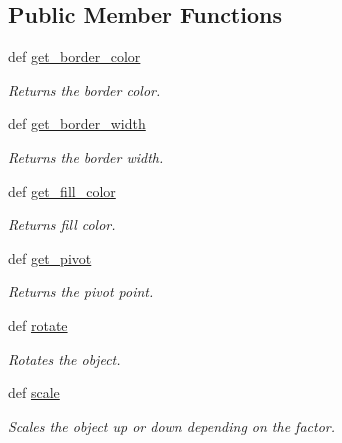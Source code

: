 \subsection*{Public Member Functions}
\begin{DoxyCompactItemize}
\item 
def \hyperlink{classcs110graphics_1_1Fillable_a6772d56158c9fe98a33f01d47cb8aa41}{get\_\-border\_\-color}
\begin{DoxyCompactList}\small\item\em Returns the border color. \item\end{DoxyCompactList}\item 
def \hyperlink{classcs110graphics_1_1Fillable_a6ed7a4288e84a090ec185c8bdff21d0f}{get\_\-border\_\-width}
\begin{DoxyCompactList}\small\item\em Returns the border width. \item\end{DoxyCompactList}\item 
def \hyperlink{classcs110graphics_1_1Fillable_a16c045bc9b63961b696914ee1a1d14d9}{get\_\-fill\_\-color}
\begin{DoxyCompactList}\small\item\em Returns fill color. \item\end{DoxyCompactList}\item 
def \hyperlink{classcs110graphics_1_1Fillable_a514fa0d21297c1372681afae9219fd58}{get\_\-pivot}
\begin{DoxyCompactList}\small\item\em Returns the pivot point. \item\end{DoxyCompactList}\item 
def \hyperlink{classcs110graphics_1_1Fillable_afa6710f6c314de39d19f06d9dd306d7d}{rotate}
\begin{DoxyCompactList}\small\item\em Rotates the object. \item\end{DoxyCompactList}\item 
def \hyperlink{classcs110graphics_1_1Fillable_a80d5b6b6d2ebae867dccecb803075749}{scale}
\begin{DoxyCompactList}\small\item\em Scales the object up or down depending on the factor. \item\end{DoxyCompactList}\item 

\end{DoxyCompactItemize}

